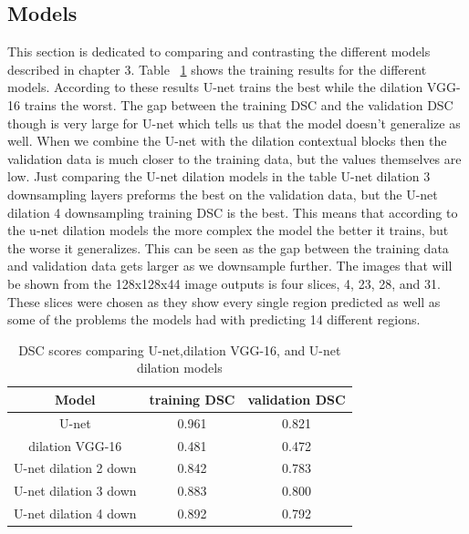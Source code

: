 \subsection{Models}
This section is dedicated to comparing and contrasting the different models described in chapter 3.
Table ~\ref{tab.multi_model_results} shows the training results for the different models. 
According to these results U-net trains the best while the dilation VGG-16 trains the worst.
The gap between the training DSC and the validation DSC though is very large for U-net which tells us that the model doesn't generalize as well. 
When we combine the U-net with the dilation contextual blocks then the validation data is much closer to the training data, but the values themselves are low. 
Just comparing the U-net dilation models in the table U-net dilation 3 downsampling layers preforms the best on the validation data, but the U-net dilation 4 downsampling training DSC is the best.
This means that according to the u-net dilation models the more complex the model the better it trains, but the worse it generalizes.
This can be seen as the gap between the training data and validation data gets larger as we downsample further. 
The images that will be shown from the 128x128x44 image outputs is four slices, 4, 23, 28, and 31. These slices were chosen as they show every single region predicted as well as some of the problems the models had with predicting 14 different regions. 


\begin{table}[tbh]
\renewcommand{\arraystretch}{1}
\centering
\begin{tabular}{|c|c|c|}
\hline
\textbf{Model} & \textbf{training DSC} & \textbf{validation DSC}\\
\hline
U-net & 0.961 & 0.821\\ %
\hline
dilation VGG-16 & 0.481 & 0.472\\  
\hline
U-net dilation 2 down & 0.842 & 0.783\\  
\hline
U-net dilation 3 down & 0.883 & 0.800\\  
\hline
U-net dilation 4 down & 0.892 & 0.792\\  
\hline
\end{tabular}
\caption{DSC scores comparing U-net,dilation VGG-16, and U-net dilation models}
\label{tab.multi_model_results}
\end{table}


